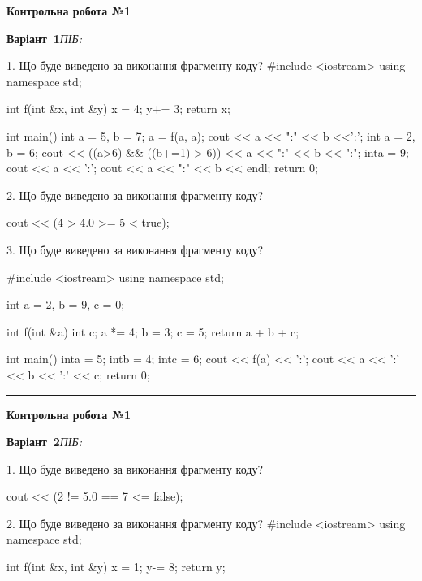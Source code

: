 \documentclass[11pt]{article}
\begin{document}
{\large\textbf{Контрольна робота №1}}

\textbf{Варіант \No\,1}\hfill \textit{ПІБ:}\,\underline{\hspace{60mm}}
\vspace{4mm}

1. Що буде виведено за виконання фрагменту коду?
#include <iostream>
using namespace std;

int f(int &x, int &y){
    x = 4;
    y+= 3;
    return x;
}

int main(){
    int a = 5, b = 7;
    a = f(a, a);
    cout << a << ":" << b <<':';
    {
        int a = 2, b = 6;
        cout << ((a>6) && ((b+=1) > 6))
             << a << ":" << b << ":";
    }
    {
        inta = 9;
        cout << a << ':';
    }
    cout << a << ":" << b << endl;
    return 0;
}


2. Що буде виведено за виконання фрагменту коду?

cout << (4 > 4.0 >= 5 < true);

3. Що буде виведено за виконання фрагменту коду?

#include <iostream>
using namespace std;

int a = 2, b = 9, c = 0;

int f(int &a){
int c;    a *= 4;
    b = 3;
    c = 5;
    return a + b + c;
}

int main(){
    inta = 5;
    intb = 4;
    intc = 6;
    cout << f(a) << ':';
    cout << a << ':' << b << ':' << c;
    return 0; 
}




\vspace{10mm}
\noindent\textcolor{gray}{\rule{\textwidth}{0.3pt}}
\vspace{8mm}
{\large\textbf{Контрольна робота №1}}

\textbf{Варіант \No\,2}\hfill \textit{ПІБ:}\,\underline{\hspace{60mm}}
\vspace{4mm}

1. Що буде виведено за виконання фрагменту коду?

cout << (2 != 5.0 == 7 <= false);

2. Що буде виведено за виконання фрагменту коду?
#include <iostream>
using namespace std;

int f(int &x, int &y){
    x = 1;
    y-= 8;
    return y;
}
\end{document}
